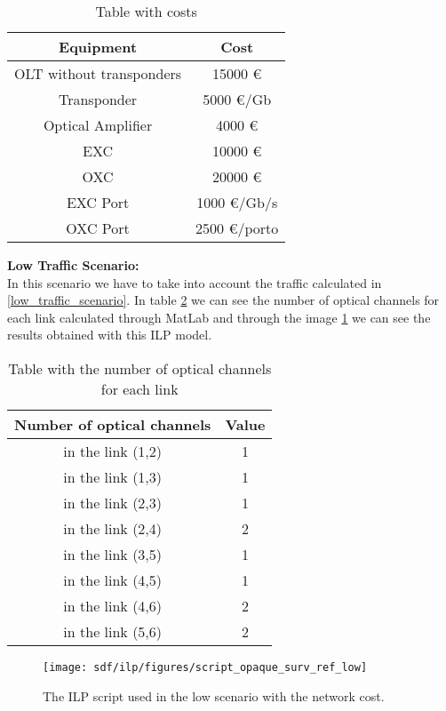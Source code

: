 \begin{table}[h!]
\centering
\begin{tabular}{|| c | c||}
 \hline
 Equipment & Cost \\
 \hline\hline
 OLT without transponders & 15000 \euro \\
 Transponder & 5000 \euro/Gb \\
 Optical Amplifier & 4000 \euro \\
 EXC & 10000 \euro \\
 OXC & 20000 \euro \\
 EXC Port & 1000 \euro /Gb/s\\
 OXC Port & 2500 \euro /porto \\
 \hline
\end{tabular}
\caption{Table with costs}
\label{table_cost_ilp}
\end{table}


\textbf{Low Traffic Scenario:}\\

In this scenario we have to take into account the traffic calculated in \ref{low_traffic_scenario}. In table \ref{result_ILP1_reference} we can see the number of optical channels for each link calculated through MatLab and through the image \ref{scriptopaque_surv_ref_low} we can see the results obtained with this ILP model.\\

\begin{table}[h!]
\centering
\begin{tabular}{|| c | c||}
 \hline
 Number of optical channels & Value \\
 \hline\hline
 in the link (1,2) & 1 \\
 in the link (1,3) & 1 \\
 in the link (2,3) & 1 \\
 in the link (2,4) & 2 \\
 in the link (3,5) & 1 \\
 in the link (4,5) & 1 \\
 in the link (4,6) & 2 \\
 in the link (5,6) & 2 \\
 \hline
\end{tabular}
\caption{Table with the number of optical channels for each link}
\label{result_ILP1_reference}
\end{table}


\begin{figure}[h!]
\centering
\texttt{[image: sdf/ilp/figures/script\_opaque\_surv\_ref\_low]}
\caption{The ILP script used in the low scenario with the network cost.}
\label{scriptopaque_surv_ref_low}
\end{figure}

